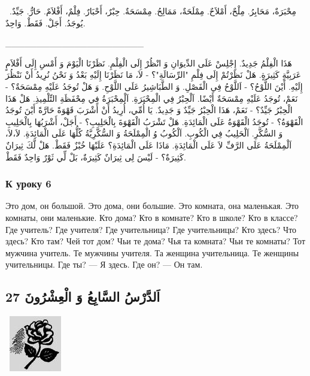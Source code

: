 \documentclass[a5paper]{article}
\begin{document}
\ مِحْبَرَةٌ، مَحَابِرُ. مِلْحٌ، أَمْلاَحٌ. مِمْلَحَةٌ، مَمَالِحُ. مِمْسَحَةٌ. حِبْرٌ، أَحْبَارٌ. فِلْمٌ، أَفْلاَمٌ. حَارٌّ. جَيِّدٌ. يُوجَدُ. أَجَلْ. فَقَطْ. وَاحِدٌ.

\_\_\_\_\_\_\_\_\_\_\_\_\_\_\_\_\_\_\_\_\_\_

هَذَا الْفِلْمُ جَدِيدٌ. إِجْلِسْ عَلَى الدِّيوَانِ وَ انْظُرْ إِلَى الْفِلْمِ. نَظَرْنَا الْيَوْمَ وَ أَمْسِ إِلَى أَفْلاَمٍ عَرَبِيَّةٍ كَثِيرَةٍ. هَلْ نَظَرْتُمْ إِلَى فِلْمِ "الرِّسَالَةِ"؟ - لاَ، مَا نَظَرْنَا إِلَيْهِ بَعْدُ وَ نَحْنُ نُرِيدُ أَنْ نَنْظُرَ إِلَيْهِ. أَيْنَ اللَّوْحُ؟ - اَللَّوْحُ فِي الْفَصْلِ. وَ الطَّبَاشِيرُ عَلَى اللَّوْحِ. وَ هَلْ تُوجَدُ عَلَيْهِ مِمْسَحَةٌ؟ - نَعَمْ، تُوجَدُ عَلَيْهِ مِمْسَحَةٌ أَيْضًا. اَلْحِبْرُ فِي الْمِحْبَرَةِ. اَلْمِحْبَرَةُ فِي مِحْفَظَةِ التِّلْمِيذِ. هَلْ هَذَا الْحِبْرُ جَيِّدٌ؟ - نَعَمْ، هَذَا الْحِبْرُ جَيِّدٌ وَ جَدِيدٌ. يَا أُمِّي، أُرِيدُ أَنْ أَشْرَبَ قَهْوَةً حَارَّةً أَيْنَ تُوجَدُ الْقَهْوَةُ؟ - تُوجَدُ الْقَهْوَةُ عَلَى الْمَائِدَةِ. هَلْ تَشْرَبُ الْقَهْوَةَ بِالْحَلِيبِ؟ - أَجَلْ، أَشْرَبُهَا بِالْحَلِيبِ وَ السُّكَّرِ. اَلْحَلِيبُ فِي الْكُوبِ. اَلْكُوبُ وُ الْمِمْلَحَةُ وَ السُّكَّرِيَّةُ كُلُّهَا عَلَى الْمَائِدَةِ. لاَ،لاَ، اَلْمِمْلَحَةُ عَلَى الرَّفِّ لاَ عَلَى الْمَائِدَةِ. مَاذَا عَلَى الْمَائِدَةِ؟ عَلَيْهَا خُبْزٌ فَقَطْ. هَلْ لَّكَ ثِيرَانٌ كَثِيرَةٌ؟ - لَيْسَ لِى ثِيرَانٌ كَثِيرَةٌ، بَلْ لِّي ثَوْرٌ وَاحِدٌ فَقَطْ.

\subsubsection{К уроку 6}
Это дом, он большой. Это дома, они большие. Это комната, она маленькая. Это комнаты, они маленькие. Кто дома? Кто в комнате? Кто в школе? Кто в классе? Где учитель? Где учителя? Где учительница? Где учительницы? Кто здесь? Что здесь? Кто там? Чей тот дом? Чьи те дома? Чья та комната? Чьи те комнаты? Тот мужчина учитель. Те мужчины учителя. Та женщина учительница. Те женщины учительницы. Где ты? — Я здесь. Где он? — Он там.

\subsection{27 اَلدَّرْسُ السَّابِعُ وَ الْعِشْرُونَ}
\  \includegraphics[width=0.8957in,height=0.9583in]{MuhammadBagauddinlatinized-img056.jpg} 
\end{document}
